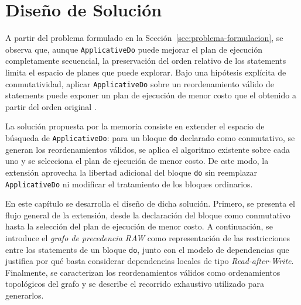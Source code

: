 
\chapter{Diseño de Solución}
\label{chap:diseno-solucion}

A partir del problema formulado en la Sección~\ref{sec:problema-formulacion}, se observa que, aunque \texttt{ApplicativeDo} puede mejorar el plan de ejecución completamente secuencial, la preservación del orden relativo de los statements limita el espacio de planes que puede explorar. Bajo una hipótesis explícita de conmutatividad, aplicar \texttt{ApplicativeDo} sobre un reordenamiento válido de statements puede exponer un plan de ejecución de menor costo que el obtenido a partir del orden original \cite[pp.~94--95]{MarlowPJKM2016}.

La solución propuesta por la memoria consiste en extender el espacio de búsqueda de \texttt{ApplicativeDo}: para un bloque \texttt{do} declarado como conmutativo, se generan los reordenamientos válidos, se aplica el algoritmo existente sobre cada uno y se selecciona el plan de ejecución de menor costo. De este modo, la extensión aprovecha la libertad adicional del bloque \texttt{do} sin reemplazar \texttt{ApplicativeDo} ni modificar el tratamiento de los bloques ordinarios.

En este capítulo se desarrolla el diseño de dicha solución. Primero, se presenta el flujo general de la extensión, desde la declaración del bloque como conmutativo hasta la selección del plan de ejecución de menor costo. A continuación, se introduce el \textit{grafo de precedencia RAW} como representación de las restricciones entre los statements de un bloque \texttt{do}, junto con el modelo de dependencias que justifica por qué basta considerar dependencias locales de tipo \textit{Read-after-Write}. Finalmente, se caracterizan los reordenamientos válidos como ordenamientos topológicos del grafo y se describe el recorrido exhaustivo utilizado para generarlos.




